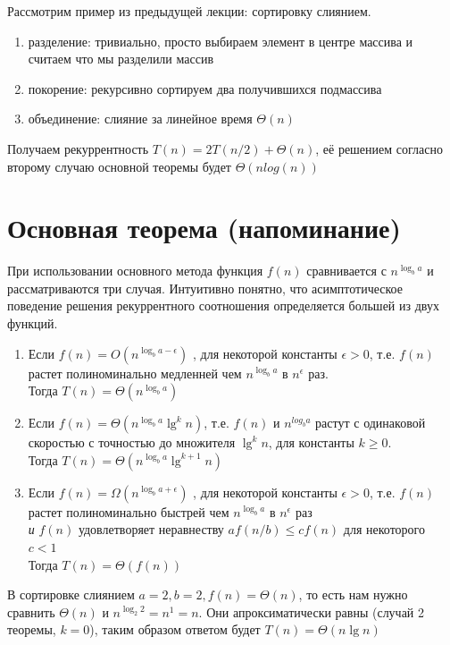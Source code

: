 \documentclass[a4paper,11pt]{article}
\begin{document}
Рассмотрим пример из предыдущей лекции: сортировку слиянием.
\begin{enumerate}
\item разделение: тривиально, просто выбираем элемент в центре массива и считаем
  что мы разделили массив
\item покорение: рекурсивно сортируем два получившихся подмассива
\item объединение: слияние за линейное время $\Theta(n)$
\end{enumerate}

Получаем рекуррентность $T(n) = 2T(n/2) + \Theta(n)$, её решением согласно
второму случаю основной теоремы будет $\Theta(n log(n))$

\section{Основная теорема (напоминание)}

При использовании основного метода функция $f(n)$ сравнивается с $n^{\log_b a}$
и рассматриваются три случая. Интуитивно понятно, что асимптотическое поведение
решения рекуррентного соотношения определяется большей из двух функций.

\begin{enumerate}
\item Если $f(n) = O(n^{\log_{b}{a - \epsilon}})$ , для некоторой константы
  $\epsilon > 0$, т.е. $f(n)$ растет полиноминально медленней чем
  $n^{\log_b a}$ в $n^\epsilon$ раз.\\
  Тогда $T(n) = \Theta(n^{\log_b a})$

\item Если $f(n) = \Theta(n^{\log_b a}\lg^k n)$, т.е. $f(n)$ и $n^{log_b a}$
  растут с одинаковой скоростью с точностью до множителя $\lg^k n$, для
  константы $k \geqslant 0$.\\ Тогда $T(n) = \Theta(n^{\log_b a} \lg^{k+1} n)$

\item Если $f(n) = \Omega(n^{\log_b{a + \epsilon}})$ , для некоторой константы
  $\epsilon > 0$, т.е. $f(n)$ растет полиноминально быстрей чем $n^{\log_b a}$
  в $n^\epsilon$ раз \\ \emph{и} $f(n)$ удовлетворяет неравнеству $a f(n/b)
  \leqslant c f(n)$ для некоторого $c < 1$ \\ Тогда $T(n) = \Theta(f(n))$
\end{enumerate}

В сортировке слиянием $a = 2, b = 2, f(n) = \Theta(n)$, то есть нам нужно
сравнить $\Theta(n)$ и $n^{\log_2 2} = n^1 = n$. Они апроксиматически равны
(случай 2 теоремы, $k = 0$), таким образом ответом будет $T(n) = \Theta(n \lg
n)$
\end{document}
